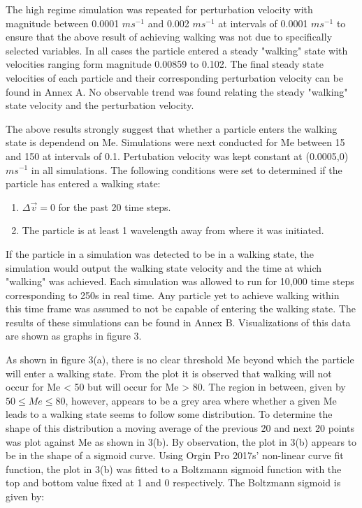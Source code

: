 The high regime simulation was repeated for perturbation velocity with magnitude between 0.0001 $ms^{-1}$ and 0.002 $ms^{-1}$ at intervals of 0.0001 $ms^{-1}$ to ensure that the above result of achieving walking was not due to specifically selected variables. In all cases the particle entered a steady "walking" state with velocities ranging form magnitude 0.00859 to 0.102. The final steady state velocities of each particle and their corresponding perturbation velocity can be found in Annex A. No observable trend was found relating the steady "walking" state velocity and the perturbation velocity.

The above results strongly suggest that whether a particle enters the walking state is dependend on Me. Simulations were next conducted for Me between 15 and 150 at intervals of 0.1. Pertubation velocity was kept constant at (0.0005,0) $ms^{-1}$ in all simulations. The following conditions were set to determined if the particle has entered a walking state:

\medskip
\begin{enumerate}
    \item $\Delta\vec{v} = 0$ for the past 20 time steps.
    \item The particle is at least 1 wavelength away from where it was initiated.
\end{enumerate}
\medskip

If the particle in a simulation was detected to be in a walking state, the simulation would output the walking state velocity and the time at which "walking" was achieved. Each simulation was allowed to run for 10,000 time steps corresponding to 250s in real time. Any particle yet to achieve walking within this time frame was assumed to not be capable of entering the walking state. The results of these simulations can be found in Annex B. Visualizations of this data are shown as graphs in figure 3. 

As shown in figure 3(a), there is no clear threshold Me beyond which the particle will enter a walking state. From the plot it is observed that walking will not occur for Me < 50 but will occur for Me > 80. The region in between, given by $50\leq Me\leq80$, however, appears to be a grey area where whether a given Me leads to a walking state seems to follow some distribution. To determine the shape of this distribution a moving average of the previous 20 and next 20 points was plot against Me as shown in 3(b). By observation, the plot in 3(b) appears to be in the shape of a sigmoid curve. Using Orgin Pro 2017s' non-linear curve fit function, the plot in 3(b) was fitted to a Boltzmann sigmoid function with the top and bottom value fixed at 1 and 0 respectively. The Boltzmann sigmoid is given by:

